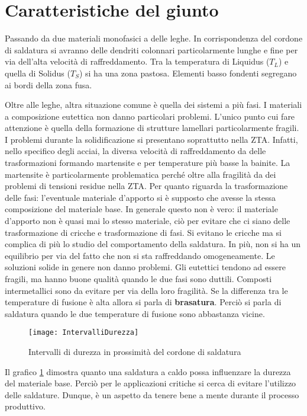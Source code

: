 \section{Caratteristiche del giunto}
Passando da due materiali monofasici a delle leghe.
In corrispondenza del cordone di saldatura si avranno delle dendriti colonnari particolarmente lunghe e fine per via dell'alta velocità di raffreddamento.
Tra la temperatura di Liquidus ($T_L$) e quella di Solidus ($T_S$) si ha una zona pastosa.
Elementi basso fondenti segregano ai bordi della zona fusa.

Oltre alle leghe, altra situazione comune è quella dei sistemi a più fasi.
I materiali a composizione eutettica non danno particolari problemi. L'unico punto cui fare attenzione è quella della formazione di strutture lamellari particolarmente fragili.
I problemi durante la solidificazione si presentano soprattutto nella \ac{ZTA}.
Infatti, nello specifico degli acciai, la diversa velocità di raffreddamento da delle trasformazioni formando martensite e per temperature più basse la bainite.
La martensite è particolarmente problematica perché oltre alla fragilità da dei problemi di tensioni residue nella \ac{ZTA}.
Per quanto riguarda la trasformazione delle fasi: l'eventuale materiale d'apporto si è supposto che avesse la stessa composizione del materiale base. In generale questo non è vero: il materiale d'apporto non è quasi mai lo stesso materiale, ciò per evitare che ci siano delle trasformazione di cricche e trasformazione di fasi.
Si evitano le cricche ma si complica di più lo studio del comportamento della saldatura. In più, non si ha un equilibrio per via del fatto che non si sta raffreddando omogeneamente.
Le soluzioni solide in genere non danno problemi.
Gli eutettici tendono ad essere fragili, ma hanno buone qualità quando le due fasi sono duttili.
Composti intermetallici sono da evitare per via della loro fragilità.
Se la differenza tra le temperature di fusione è alta allora si parla di \textbf{brasatura}.
Perciò si parla di saldatura quando le due temperature di fusione sono abbastanza vicine.

\begin{figure}
\centering
\texttt{[image: IntervalliDurezza]}
\caption{Intervalli di durezza in prossimità del cordone di saldatura}
\label{fig:IntervalliDurezza}
\end{figure}

Il grafico \ref{fig:IntervalliDurezza} dimostra quanto una saldatura a caldo possa influenzare la durezza del materiale base. Perciò per le applicazioni critiche si cerca di evitare l'utilizzo delle saldature. Dunque, è un aspetto da tenere bene a mente durante il processo produttivo.


